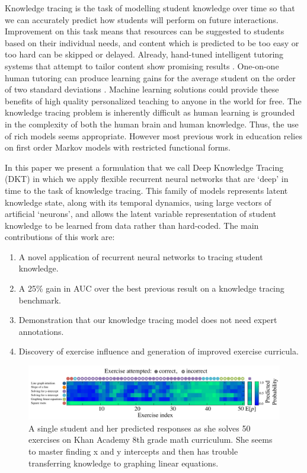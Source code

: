 Knowledge tracing is the task of modelling student knowledge over time so that we can accurately predict how students will perform on future interactions.  Improvement on this task means that resources can be suggested to students based on their individual needs, and content which is predicted to be too easy or too hard
can be skipped or delayed. Already, hand-tuned intelligent tutoring systems that attempt to tailor content show promising results \cite{polson2013foundations}. %
One-on-one human tutoring 
can produce learning gains for the average student on the order of two standard deviations \cite{corbett2001cognitive}.
Machine learning solutions could provide these benefits of 
high quality personalized teaching to anyone in the world for free. The knowledge tracing problem is inherently difficult as human learning is grounded in the complexity of both the human brain and human knowledge.
Thus, the use of rich models seems appropriate.
However most previous work in education relies on first order Markov models with restricted functional forms.

In this paper we present a formulation that we call Deep Knowledge Tracing (DKT) in which we apply flexible recurrent neural networks that are `deep' in time to the task of knowledge tracing. 
This family of models represents latent knowledge state, along with its temporal dynamics, using large vectors of artificial `neurons', and allows the latent variable representation of student knowledge to be learned from data rather than hard-coded.
The main contributions of this work are:
\begin{enumerate}
\item A novel application of recurrent neural networks to tracing student knowledge.
\item A 25\% gain in AUC over the best previous result on a knowledge tracing benchmark. 
\item Demonstration that our knowledge tracing model does not need expert annotations.
\item Discovery of exercise influence and generation of improved exercise curricula.
\end{enumerate}

\begin{figure}[t]
\centering
\includegraphics[width=1.0\textwidth]{img/singleStudent}

\caption[Single Khan student trace]{A single student and her predicted responses as she solves 50 exercises on Khan Academy 8th grade math curriculum. She seems to master finding x and y intercepts and then has trouble transferring knowledge to graphing linear equations.
\label{fig:singleStudent}
}

\end{figure}

